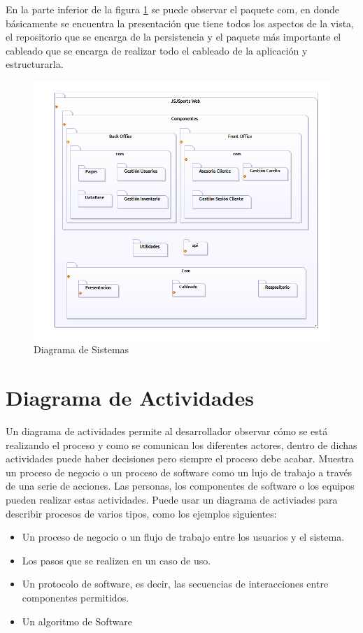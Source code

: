 En la parte inferior de la figura \ref{fig:sistemas} se puede observar el paquete com, en donde básicamente se encuentra la presentación que tiene todos los aspectos de la vista, el repositorio que se encarga de la persistencia y el paquete más importante el cableado que se encarga de realizar todo el cableado de la aplicación y estructurarla.



\begin{figure}[h!]
	\centering
	\includegraphics[width=0.9\linewidth]{arquitectura/imagenes/DiagramaDeSistemas}
	\caption{Diagrama de Sistemas}
	\label{fig:sistemas}
\end{figure}


\newpage

\section{Diagrama de Actividades}
Un diagrama de actividades permite al desarrollador observar cómo se está realizando el proceso y como se comunican los diferentes actores, dentro de dichas actividades puede haber decisiones pero siempre el proceso debe acabar.\newline
Muestra un proceso de negocio o un proceso de software como un lujo de trabajo a través de una serie de acciones. Las personas, los componentes de software o los equipos pueden realizar estas actividades.
Puede usar un diagrama de activiades para describir procesos de varios tipos, como los ejemplos siguientes:
\begin{itemize}
   \item Un proceso de negocio o un flujo de trabajo entre los usuarios y el sistema.
	\item Los pasos que se realizen en un caso de uso.
	\item Un protocolo de software, es decir, las secuencias de interacciones entre componentes permitidos.
	\item Un algoritmo de Software
\end{itemize} 

